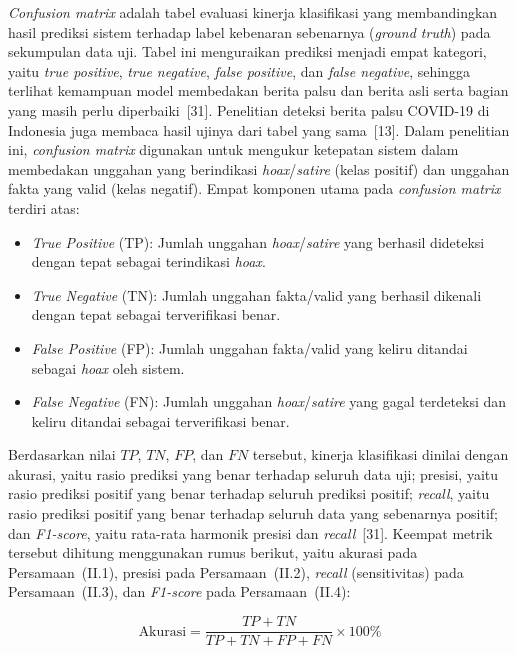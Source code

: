 \documentclass[12pt,a4paper,twoside]{report}
\begin{document}
\textit{Confusion matrix} adalah tabel evaluasi kinerja klasifikasi yang membandingkan hasil prediksi sistem terhadap label kebenaran sebenarnya (\textit{ground truth}) pada sekumpulan data uji. Tabel ini menguraikan prediksi menjadi empat kategori, yaitu \textit{true positive}, \textit{true negative}, \textit{false positive}, dan \textit{false negative}, sehingga terlihat kemampuan model membedakan berita palsu dan berita asli serta bagian yang masih perlu diperbaiki~[31]. Penelitian deteksi berita palsu COVID-19 di Indonesia juga membaca hasil ujinya dari tabel yang sama~[13]. Dalam penelitian ini, \textit{confusion matrix} digunakan untuk mengukur ketepatan sistem dalam membedakan unggahan yang berindikasi \textit{hoax}/\textit{satire} (kelas positif) dan unggahan fakta yang valid (kelas negatif). Empat komponen utama pada \textit{confusion matrix} terdiri atas:
\begin{itemize}[leftmargin=0.8cm,itemsep=2pt,topsep=2pt]
  \item \textit{True Positive} (TP): Jumlah unggahan \textit{hoax}/\textit{satire} yang berhasil dideteksi dengan tepat sebagai terindikasi \textit{hoax}.
  \item \textit{True Negative} (TN): Jumlah unggahan fakta/valid yang berhasil dikenali dengan tepat sebagai terverifikasi benar.
  \item \textit{False Positive} (FP): Jumlah unggahan fakta/valid yang keliru ditandai sebagai \textit{hoax} oleh sistem.
  \item \textit{False Negative} (FN): Jumlah unggahan \textit{hoax}/\textit{satire} yang gagal terdeteksi dan keliru ditandai sebagai terverifikasi benar.
\end{itemize}

Berdasarkan nilai $TP$, $TN$, $FP$, dan $FN$ tersebut, kinerja klasifikasi dinilai dengan akurasi, yaitu rasio prediksi yang benar terhadap seluruh data uji; presisi, yaitu rasio prediksi positif yang benar terhadap seluruh prediksi positif; \textit{recall}, yaitu rasio prediksi positif yang benar terhadap seluruh data yang sebenarnya positif; dan \textit{F1-score}, yaitu rata-rata harmonik presisi dan \textit{recall}~[31]. Keempat metrik tersebut dihitung menggunakan rumus berikut, yaitu akurasi pada Persamaan~(II.1), presisi pada Persamaan~(II.2), \textit{recall} (sensitivitas) pada Persamaan~(II.3), dan \textit{F1-score} pada Persamaan~(II.4):

\begin{equation}
  \text{Akurasi} = \frac{TP + TN}{TP + TN + FP + FN} \times 100\%
  \tag{II.1}
\end{equation}
\end{document}
